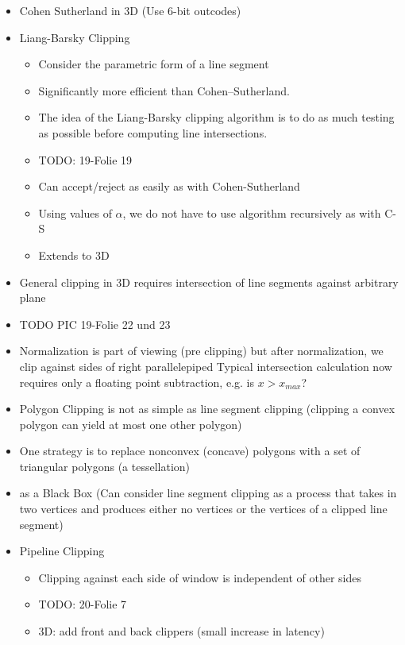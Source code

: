 \documentclass[11pt,a4paper]{article}
\begin{document}
\begin{itemize}
\begin{itemize}
\begin{enumerate}
						\end{enumerate}
				\end{itemize}
			\item Cohen Sutherland in 3D (Use 6-bit outcodes)
			\item Liang-Barsky Clipping
				\begin{itemize}
					\item Consider the parametric form of a line segment
					\item Significantly more efficient than Cohen–Sutherland.
					\item The idea of the Liang-Barsky clipping algorithm is to do as much testing as possible before computing line intersections.
					\item TODO: 19-Folie 19
					\item Can accept/reject as easily as with Cohen-Sutherland
					\item Using values of $\alpha$, we do not have to use algorithm recursively as with C-S
					\item Extends to 3D
				\end{itemize}
			\item General clipping in 3D requires intersection of line segments against arbitrary plane
			\item TODO PIC 19-Folie 22 und 23
			\item Normalization is part of viewing (pre clipping) but after normalization, we clip against sides of right parallelepiped Typical intersection calculation now requires only a floating point subtraction, e.g. is $x > x_{max}$?
			\item Polygon Clipping is not as simple as line segment clipping (clipping a convex polygon can yield at most one other polygon)
			\item One strategy is to replace nonconvex (concave) polygons with a set of triangular polygons (a tessellation)
			\item as a Black Box (Can consider line segment clipping as a process that takes in two vertices and produces either no vertices or the vertices of a clipped line segment)
			\item Pipeline Clipping
				\begin{itemize}
					\item Clipping against each side of window is independent of other sides
					\item TODO: 20-Folie 7
					\item 3D: add front and back clippers (small increase in latency)
				\end{itemize}

\end{itemize}
\end{document}
